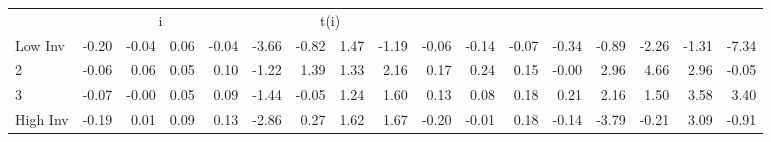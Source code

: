 \begin{table}[!ht]
\begin{tabular}{lrrrrrrrrrrrrrrrr}
      & \multicolumn{4}{c}{i} & \multicolumn{4}{c}{t(i)}
    
    \\
      \cmidrule(r){2-5} \cmidrule(r){6-9} \cmidrule(r){10-13} \cmidrule(r){14-17}

    Low Inv   & -0.20  & -0.04  & 0.06  & -0.04  & -3.66  & -0.82  & 1.47  & -1.19  & -0.06  & -0.14  & -0.07  & -0.34  & -0.89  & -2.26  & -1.31  & -7.34  \\
           2  & -0.06  & 0.06  & 0.05  & 0.10  & -1.22  & 1.39  & 1.33  & 2.16  & 0.17  & 0.24  & 0.15  & -0.00  & 2.96  & 4.66  & 2.96  & -0.05  \\
           3  & -0.07  & -0.00  & 0.05  & 0.09  & -1.44  & -0.05  & 1.24  & 1.60  & 0.13  & 0.08  & 0.18  & 0.21  & 2.16  & 1.50  & 3.58  & 3.40  \\
    High Inv  & -0.19  & 0.01  & 0.09  & 0.13  & -2.86  & 0.27  & 1.62  & 1.67  & -0.20  & -0.01  & 0.18  & -0.14  & -3.79  & -0.21  & 3.09  & -0.91  \\

  

  \bottomrule
\end{tabular}
\label{tbl:32_Size_BMm_Prior_B16b}
\end{table}